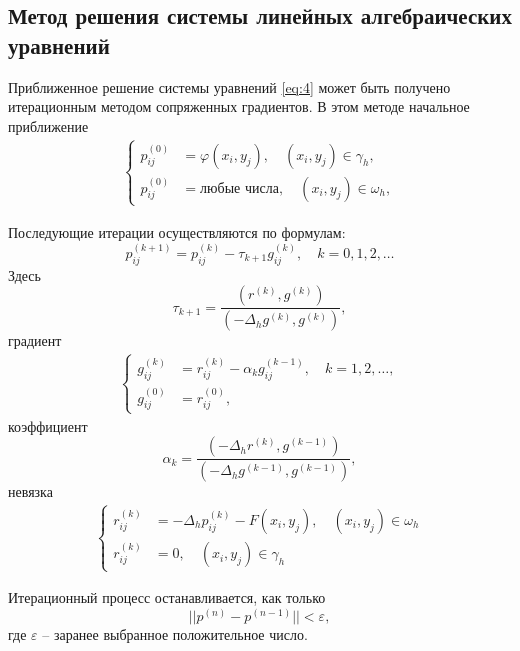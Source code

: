 \documentclass[12pt, a4paper]{article}
\begin{document}
        \subsection{Метод решения системы линейных алгебраических уравнений}
            Приближенное решение системы уравнений \eqref{eq:4} может быть получено итерационным методом сопряженных градиентов. В этом методе начальное приближение
                \begin{gather*}
                \begin{cases}
                    p_{ij}^{(0)} &= \varphi(x_i, y_j), \quad (x_i, y_j) \in \gamma_h,\\
                    p_{ij}^{(0)} &= \text{любые числа}, \quad (x_i, y_j) \in \omega_h,
                \end{cases}
                \end{gather*}

            Последующие итерации осуществляются по формулам:
                $$p_{ij}^{(k+1)} = p_{ij}^{(k)} - \tau_{k+1} g_{ij}^{(k)}, \quad k=0,1,2,\dots$$
            Здесь
                $$\tau_{k+1} = \frac{(r^{(k)},g^{(k)})}{(-\Delta_h g^{(k)},g^{(k)})},$$
            градиент
                \begin{gather*}
                \begin{cases}
                    g_{ij}^{(k)} &= r_{ij}^{(k)} - \alpha_k g_{ij}^{(k - 1)}, \quad k=1,2,\dots,\\
                    g_{ij}^{(0)} &= r_{ij}^{(0)},
                \end{cases}
                \end{gather*}
            коэффициент
                $$\alpha_{k} = \frac{(-\Delta_h r^{(k)},g^{(k-1)})}{(-\Delta_h g^{(k-1)},g^{(k-1)})},$$
            невязка
                \begin{gather*}
                \begin{cases}
                    r_{ij}^{(k)} &= -\Delta_h p_{ij}^{(k)} - F(x_i, y_j), \quad (x_i, y_j) \in \omega_h\\
                    r_{ij}^{(k)} &= 0, \quad (x_i, y_j) \in \gamma_h
                \end{cases}
                \end{gather*}

            Итерационный процесс останавливается, как только
            $$||p^{(n)} - p^{(n-1)}|| < \varepsilon,$$
            где $\varepsilon$ -- заранее выбранное положительное число.
\end{document}
